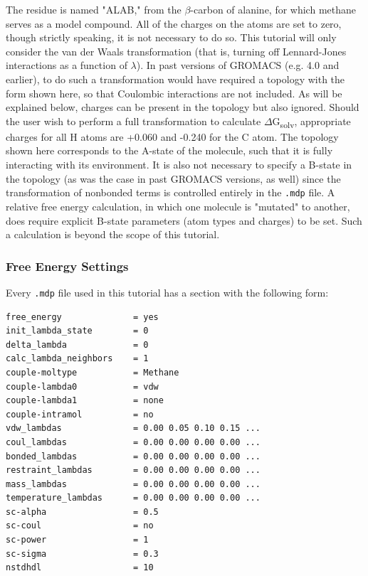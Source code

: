\documentclass[9pt,tutorial,pubversion]{livecoms}
\begin{document}
The residue is named "ALAB," from the $\beta$-carbon of alanine, for which methane serves as a model compound. All of the charges on the atoms are set to zero, though strictly speaking, it is not necessary to do so. This tutorial will only consider the van der Waals transformation (that is, turning off Lennard-Jones interactions as a function of $\lambda$). In past versions of GROMACS (e.g. 4.0 and earlier), to do such a transformation would have required a topology with the form shown here, so that Coulombic interactions are not included. As will be explained below, charges can be present in the topology but also ignored. Should the user wish to perform a full transformation to calculate $\Delta$G\textsubscript{solv}, appropriate charges for all H atoms are +0.060 and -0.240 for the C atom. The topology shown here corresponds to the A-state of the molecule, such that it is fully interacting with its environment. It is also not necessary to specify a B-state in the topology (as was the case in past GROMACS versions, as well) since the transformation of nonbonded terms is controlled entirely in the \texttt{.mdp} file. A relative free energy calculation, in which one molecule is "mutated" to another, does require explicit B-state parameters (atom types and charges) to be set. Such a calculation is beyond the scope of this tutorial.

\subsubsection{Free Energy Settings} \label{fes_settings}

Every \texttt{.mdp} file used in this tutorial has a section with the following form:

\begin{lstlisting}[basicstyle=\footnotesize\ttfamily]
free_energy              = yes
init_lambda_state        = 0
delta_lambda             = 0
calc_lambda_neighbors    = 1
couple-moltype           = Methane
couple-lambda0           = vdw
couple-lambda1           = none
couple-intramol          = no
vdw_lambdas              = 0.00 0.05 0.10 0.15 ...
coul_lambdas             = 0.00 0.00 0.00 0.00 ...
bonded_lambdas           = 0.00 0.00 0.00 0.00 ...
restraint_lambdas        = 0.00 0.00 0.00 0.00 ...
mass_lambdas             = 0.00 0.00 0.00 0.00 ...
temperature_lambdas      = 0.00 0.00 0.00 0.00 ...
sc-alpha                 = 0.5
sc-coul                  = no
sc-power                 = 1
sc-sigma                 = 0.3
nstdhdl                  = 10
\end{lstlisting}
\end{document}

